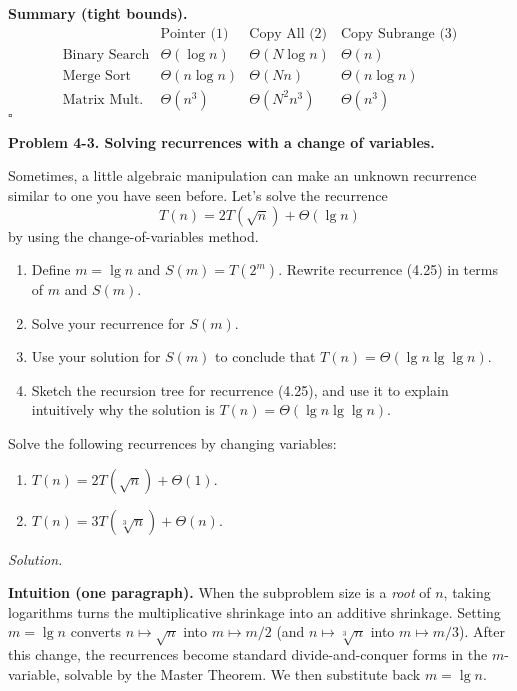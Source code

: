 \documentclass[12pt]{article}
\theoremstyle{definition}
\begin{document}
\medskip
\noindent\textbf{Summary (tight bounds).}
\[
\begin{array}{c|c|c|c}
 & \text{Pointer (1)} & \text{Copy All (2)} & \text{Copy Subrange (3)}\\ \hline
\text{Binary Search} & \Theta(\log n) & \Theta(N\log n) & \Theta(n)\\
\text{Merge Sort} & \Theta(n\log n) & \Theta(Nn) & \Theta(n\log n)\\
\text{Matrix Mult.} & \Theta(n^3) & \Theta(N^2 n^3) & \Theta(n^3)
\end{array}
\]
\hfill$\square$

\newpage

\noindent\textbf{Problem 4-3. Solving recurrences with a change of variables.}

\medskip
Sometimes, a little algebraic manipulation can make an unknown recurrence similar to one you have seen before. Let’s solve the recurrence
\[
T(n)=2T(\sqrt{n})+\Theta(\lg n)\tag{4.25}
\]
by using the change-of-variables method.

\begin{enumerate}
\item Define $m=\lg n$ and $S(m)=T(2^m)$. Rewrite recurrence (4.25) in terms of $m$ and $S(m)$.
\item Solve your recurrence for $S(m)$.
\item Use your solution for $S(m)$ to conclude that $T(n)=\Theta(\lg n \lg\lg n)$.
\item Sketch the recursion tree for recurrence (4.25), and use it to explain intuitively why the solution is $T(n)=\Theta(\lg n \lg\lg n)$.
\end{enumerate}

Solve the following recurrences by changing variables:
\begin{enumerate}
\item $T(n)=2T(\sqrt{n})+\Theta(1)$.
\item $T(n)=3T(\sqrt[3]{n})+\Theta(n)$.
\end{enumerate}

\medskip
\noindent\textit{Solution.}

\medskip
\noindent\textbf{Intuition (one paragraph).}
When the subproblem size is a \emph{root} of $n$, taking logarithms turns the multiplicative shrinkage into an additive shrinkage. Setting $m=\lg n$ converts $n\mapsto \sqrt{n}$ into $m\mapsto m/2$ (and $n\mapsto \sqrt[3]{n}$ into $m\mapsto m/3$). After this change, the recurrences become standard divide-and-conquer forms in the $m$-variable, solvable by the Master Theorem. We then substitute back $m=\lg n$.
\end{document}
